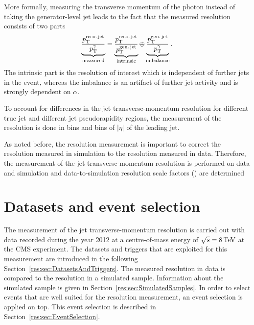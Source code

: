More formally, measuring the transverse momentum of the photon instead of taking the generator-level jet \pt leads to the fact that the measured resolution consists of two parts
\begin{equation}\label{res:eq:splitting}
\underbrace{\frac{{p}_\mathrm{T}^{\text{reco.\,jet}}}{{p}_\mathrm{T}^{\gamma}}}_{\text{measured}} = \underbrace{\frac{{p}_\mathrm{T}^{\text{reco.\,jet}}}{{p}_\mathrm{T}^{\text{gen.\,jet}}}}_{\text{intrinsic}} \oplus \underbrace{\frac{{p}_\mathrm{T}^{\text{gen.\,jet}}}{{p}_\mathrm{T}^{\gamma}}}_{\text{imbalance}}.
\end{equation}
The intrinsic part is the resolution of interest which is independent of further jets in the event, whereas the imbalance is an artifact of further jet activity and is strongly dependent on $\alpha$.


To account for differences in the jet transverse-momentum resolution for different true jet \pt and different jet pseudorapidity regions, the measurement of the resolution is done in \ptgamma bins and bins of $|\eta|$ of the leading jet.

As noted before, the resolution measurement is important to correct the resolution measured in simulation to the resolution measured in data.
Therefore, the measurement of the jet transverse-momentum resolution is performed on data and simulation and data-to-simulation resolution scale factors (\rhores) are determined
\FloatBarrier
\chapter{Datasets and event selection}

The measurement of the jet transverse-momentum resolution is carried out with \GAMJET data recorded during the year 2012 at a centre-of-mass energy of $\sqrt{s}=8\,\text{Te}\kern-0.06667em\text{V}$ at the CMS experiment.
The datasets and triggers that are exploited for this measurement are introduced in the following Section~\ref{res:sec:DatasetsAndTriggers}.
The measured resolution in data is compared to the resolution in a simulated \GAMJET sample. %
Information about the simulated sample is given in Section~\ref{res:sec:SimulatedSamples}.
In order to select \GAMJET events that are well suited for the resolution measurement, an event selection is applied on top.
This event selection is described in Section~\ref{res:sec:EventSelection}.

